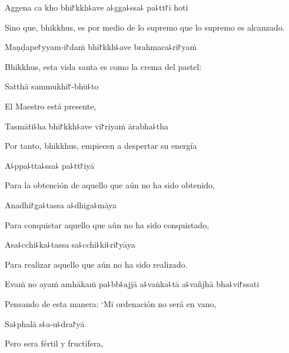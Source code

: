 Aggena ca kho bhi꜓kkh꜕ave a꜕gga꜕ssa꜕ pa꜕tt꜓i hoti

\begin{english}
	Sino que, bhikkhus, es por medio de lo supremo que lo supremo es alcanzado.
\end{english}

Maṇḍape꜓yyam-i꜓daṁ bhi꜓kkh꜕ave brahmaca꜕ri꜓yaṁ

\begin{english}
	Bhikkhus, esta vida santa es como la crema del pastel:
\end{english}

Satthā sammukhī꜓-bhū꜕to

\begin{english}
	El Maestro está presente,
\end{english}

Tasmāti꜕ha bhi꜓kkh꜕ave vī꜓riyaṁ ārabha꜕tha

\begin{english}
	Por tanto, bhikkhus, empiecen a despertar su energía
\end{english}

A꜕ppa꜕tta꜕ssa꜕ pa꜕tt꜓iyā

\begin{english}
	Para la obtención de aquello que aún no ha sido obtenido,
\end{english}

\ifaivedition
\clearpage
\fi

Anadhi꜓ga꜕tassa a꜕dhiga꜕māya

\begin{english}
	Para conquistar aquello que aún no ha sido conquistado,
\end{english}

Asa꜕cchi꜕ka꜕tassa sa꜕cchi꜕ki꜕ri꜓yāya

\begin{english}
	Para realizar aquello que aún no ha sido realizado.
\end{english}

Evaṁ no ayaṁ amhākaṁ pa꜕bb꜕ajjā a꜕vaṅka꜕tā a꜕vañjhā bha꜕vi꜓ssati

\begin{english}
	Pensando de esta manera: `Mi ordenación no será en vano,
\end{english}

Sa꜕phalā s꜕a-u꜕dra꜓yā

\begin{english}
	Pero sera fértil y fructífera,
\end{english}

